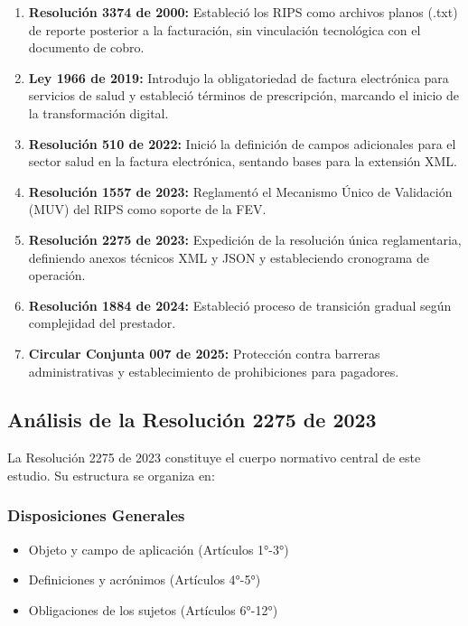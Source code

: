 \documentclass[12pt,letterpaper]{report}
\begin{document}
\begin{marcolegal}
\begin{enumerate}
    \item \textbf{Resolución 3374 de 2000:} Estableció los RIPS como archivos planos (.txt) de reporte posterior a la facturación, sin vinculación tecnológica con el documento de cobro.
    
    \item \textbf{Ley 1966 de 2019:} Introdujo la obligatoriedad de factura electrónica para servicios de salud y estableció términos de prescripción, marcando el inicio de la transformación digital.
    
    \item \textbf{Resolución 510 de 2022:} Inició la definición de campos adicionales para el sector salud en la factura electrónica, sentando bases para la extensión XML.
    
    \item \textbf{Resolución 1557 de 2023:} Reglamentó el Mecanismo Único de Validación (MUV) del RIPS como soporte de la FEV.
    
    \item \textbf{Resolución 2275 de 2023:} Expedición de la resolución única reglamentaria, definiendo anexos técnicos XML y JSON y estableciendo cronograma de operación.
    
    \item \textbf{Resolución 1884 de 2024:} Estableció proceso de transición gradual según complejidad del prestador.
    
    \item \textbf{Circular Conjunta 007 de 2025:} Protección contra barreras administrativas y establecimiento de prohibiciones para pagadores.
\end{enumerate}
\end{marcolegal}

\subsection{Análisis de la Resolución 2275 de 2023}

La Resolución 2275 de 2023 constituye el cuerpo normativo central de este estudio. Su estructura se organiza en:

\subsubsection{Disposiciones Generales}
\begin{itemize}
    \item Objeto y campo de aplicación (Artículos 1°-3°)
    \item Definiciones y acrónimos (Artículos 4°-5°)
    \item Obligaciones de los sujetos (Artículos 6°-12°)
\end{itemize}
\end{document}
